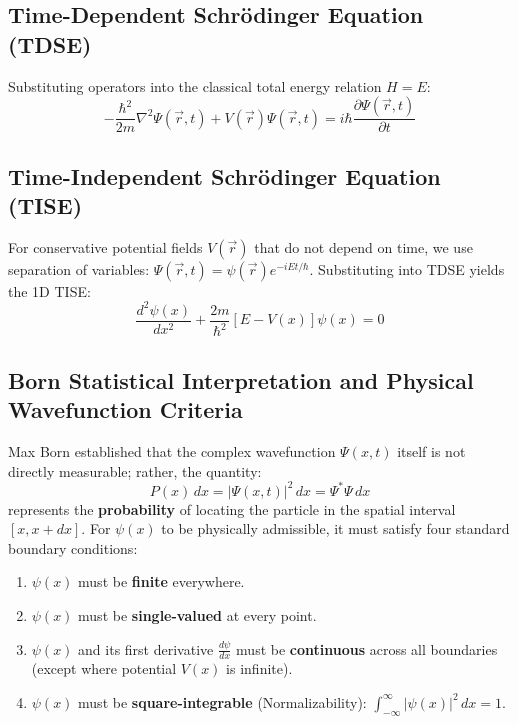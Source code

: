 \subsection{Time-Dependent Schrödinger Equation (TDSE)}
Substituting operators into the classical total energy relation $H = E$:
\begin{equation}
-\frac{\hbar^2}{2m}\nabla^2 \Psi(\vec{r},t) + V(\vec{r})\Psi(\vec{r},t) = i\hbar\frac{\partial \Psi(\vec{r},t)}{\partial t}
\end{equation}

\subsection{Time-Independent Schrödinger Equation (TISE)}
For conservative potential fields $V(\vec{r})$ that do not depend on time, we use separation of variables: $\Psi(\vec{r},t) = \psi(\vec{r})e^{-iEt/\hbar}$. Substituting into TDSE yields the 1D TISE:
\begin{equation}
\frac{d^2 \psi(x)}{dx^2} + \frac{2m}{\hbar^2}\left[ E - V(x) \right]\psi(x) = 0
\end{equation}

\subsection{Born Statistical Interpretation and Physical Wavefunction Criteria}
Max Born established that the complex wavefunction $\Psi(x,t)$ itself is not directly measurable; rather, the quantity:
\begin{equation}
P(x)\,dx = |\Psi(x,t)|^2\,dx = \Psi^* \Psi \, dx
\end{equation}
represents the \textbf{probability} of locating the particle in the spatial interval $[x, x + dx]$.
For $\psi(x)$ to be physically admissible, it must satisfy four standard boundary conditions:
\begin{enumerate}[itemsep=2pt]
    \item $\psi(x)$ must be \textbf{finite} everywhere.
    \item $\psi(x)$ must be \textbf{single-valued} at every point.
    \item $\psi(x)$ and its first derivative $\frac{d\psi}{dx}$ must be \textbf{continuous} across all boundaries (except where potential $V(x)$ is infinite).
    \item $\psi(x)$ must be \textbf{square-integrable} (Normalizability): $\int_{-\infty}^{\infty} |\psi(x)|^2\,dx = 1$.
\end{enumerate}


